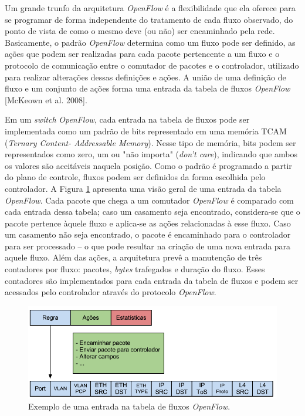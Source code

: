 Um grande trunfo da arquitetura \textit{OpenFlow} é a flexibilidade 
que ela oferece para se programar de forma independente do
tratamento de cada fluxo observado, do ponto de vista de como
o mesmo deve (ou não) ser encaminhado pela rede. Basicamente,
o padrão \textit{OpenFlow} determina como um fluxo pode ser definido,
as ações que podem ser realizadas para cada pacote pertencente
a um fluxo e o protocolo de comunicação entre o comutador de 
pacotes e o controlador, utilizado para realizar alterações dessas 
definições e ações. A união de uma definição de fluxo e um
conjunto de ações forma uma entrada da tabela de fluxos 
\textit{OpenFlow} [McKeown et al. 2008].

Em um \textit{switch} \textit{OpenFlow}, cada entrada na tabela de 
fluxos pode ser implementada como um padrão de bits 
representado em uma memória TCAM (\textit{Ternary Content-
Addressable Memory}). Nesse tipo de memória, bits podem
ser representados como zero, um ou "não importa" 
(\textit{don't care}), indicando que ambos os valores são
aceitáveis naquela posição. Como o padrão é programado
a partir do plano de controle, fluxos podem ser definidos da 
forma escolhida pelo controlador. A Figura \ref{fig:fluxoopenflow}
apresenta uma visão geral de uma entrada da tabela \textit{OpenFlow}.
Cada pacote que chega a um comutador \textit{OpenFlow} é comparado
com cada entrada dessa tabela; caso um casamento seja encontrado,
considera-se que o pacote pertence àquele fluxo e aplica-se
as ações relacionadas à esse fluxo. Caso um casamento não
seja encontrado, o pacote é encaminhado para o controlador 
para ser processado -- o que pode resultar na criação de uma
nova entrada para aquele fluxo. Além das ações, a arquitetura
prevê a manutenção de três contadores por fluxo: pacotes,
 \textit{bytes} trafegados e duração do fluxo. Esses contadores são 
implementados para cada entrada da tabela de fluxos e 
podem ser acessados pelo controlador através do protocolo
\textit{OpenFlow}.

\begin{figure}[hb] \centering
\includegraphics[width=160mm]{fluxoOpenflow.png} 
\caption{Exemplo de uma entrada na tabela de fluxos \textit{OpenFlow}.} 
\label{fig:fluxoopenflow} 
\end{figure}

